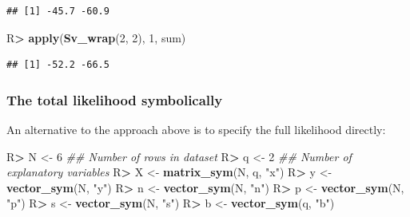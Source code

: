 \documentclass[10pt,]{article}
\newenvironment{Shaded}{\begin{snugshade}}{\end{snugshade}}
\newcommand{\CommentTok}[1]{\textcolor[rgb]{0.56,0.35,0.01}{\textit{#1}}}
\newcommand{\DecValTok}[1]{\textcolor[rgb]{0.00,0.00,0.81}{#1}}
\newcommand{\KeywordTok}[1]{\textcolor[rgb]{0.13,0.29,0.53}{\textbf{#1}}}
\newcommand{\NormalTok}[1]{#1}
\newcommand{\OperatorTok}[1]{\textcolor[rgb]{0.81,0.36,0.00}{\textbf{#1}}}
\newcommand{\StringTok}[1]{\textcolor[rgb]{0.31,0.60,0.02}{#1}}
\begin{document}
\begin{verbatim}
## [1] -45.7 -60.9
\end{verbatim}

\begin{Shaded}
\begin{Highlighting}[]
\NormalTok{R}\OperatorTok{>}\StringTok{ }\KeywordTok{apply}\NormalTok{(}\KeywordTok{Sv_wrap}\NormalTok{(}\DecValTok{2}\NormalTok{, }\DecValTok{2}\NormalTok{), }\DecValTok{1}\NormalTok{, sum)}
\end{Highlighting}
\end{Shaded}

\begin{verbatim}
## [1] -52.2 -66.5
\end{verbatim}

\hypertarget{sec:logistic-all-likelihood}{%
\subsubsection{The total likelihood
symbolically}\label{sec:logistic-all-likelihood}}

An alternative to the approach above is to specify the full likelihood
directly:

\begin{Shaded}
\begin{Highlighting}[]
\NormalTok{R}\OperatorTok{>}\StringTok{ }\NormalTok{N <-}\StringTok{ }\DecValTok{6} \CommentTok{## Number of rows in dataset}
\NormalTok{R}\OperatorTok{>}\StringTok{ }\NormalTok{q <-}\StringTok{ }\DecValTok{2} \CommentTok{## Number of explanatory variables}
\NormalTok{R}\OperatorTok{>}\StringTok{ }\NormalTok{X <-}\StringTok{ }\KeywordTok{matrix_sym}\NormalTok{(N, q, }\StringTok{"x"}\NormalTok{)}
\NormalTok{R}\OperatorTok{>}\StringTok{ }\NormalTok{y <-}\StringTok{ }\KeywordTok{vector_sym}\NormalTok{(N, }\StringTok{"y"}\NormalTok{)}
\NormalTok{R}\OperatorTok{>}\StringTok{ }\NormalTok{n <-}\StringTok{ }\KeywordTok{vector_sym}\NormalTok{(N, }\StringTok{"n"}\NormalTok{)}
\NormalTok{R}\OperatorTok{>}\StringTok{ }\NormalTok{p <-}\StringTok{ }\KeywordTok{vector_sym}\NormalTok{(N, }\StringTok{"p"}\NormalTok{)}
\NormalTok{R}\OperatorTok{>}\StringTok{ }\NormalTok{s <-}\StringTok{ }\KeywordTok{vector_sym}\NormalTok{(N, }\StringTok{"s"}\NormalTok{)}
\NormalTok{R}\OperatorTok{>}\StringTok{ }\NormalTok{b <-}\StringTok{ }\KeywordTok{vector_sym}\NormalTok{(q, }\StringTok{"b"}\NormalTok{)}
\end{Highlighting}
\end{Shaded}
\end{document}
